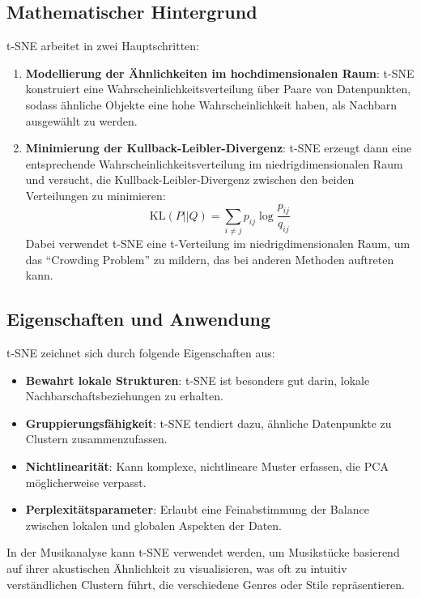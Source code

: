 \subsection{Mathematischer Hintergrund}

t-SNE arbeitet in zwei Hauptschritten:

\begin{enumerate}
    \item \textbf{Modellierung der Ähnlichkeiten im hochdimensionalen Raum}: t-SNE konstruiert eine Wahrscheinlichkeitsverteilung über Paare von Datenpunkten, sodass ähnliche Objekte eine hohe Wahrscheinlichkeit haben, als Nachbarn ausgewählt zu werden.
    \item \textbf{Minimierung der Kullback-Leibler-Divergenz}: t-SNE erzeugt dann eine entsprechende Wahrscheinlichkeitsverteilung im niedrigdimensionalen Raum und versucht, die Kullback-Leibler-Divergenz zwischen den beiden Verteilungen zu minimieren:
    \[
    \text{KL}(P || Q) = \sum_{i \neq j} p_{ij} \log \frac{p_{ij}}{q_{ij}}
    \]
    Dabei verwendet t-SNE eine t-Verteilung im niedrigdimensionalen Raum, um das ``Crowding Problem'' zu mildern, das bei anderen Methoden auftreten kann.
\end{enumerate}

\subsection{Eigenschaften und Anwendung}

t-SNE zeichnet sich durch folgende Eigenschaften aus:

\begin{itemize}
    \item \textbf{Bewahrt lokale Strukturen}: t-SNE ist besonders gut darin, lokale Nachbarschaftsbeziehungen zu erhalten.
    \item \textbf{Gruppierungsfähigkeit}: t-SNE tendiert dazu, ähnliche Datenpunkte zu Clustern zusammenzufassen.
    \item \textbf{Nichtlinearität}: Kann komplexe, nichtlineare Muster erfassen, die PCA möglicherweise verpasst.
    \item \textbf{Perplexitätsparameter}: Erlaubt eine Feinabstimmung der Balance zwischen lokalen und globalen Aspekten der Daten.
\end{itemize}

In der Musikanalyse kann t-SNE verwendet werden, um Musikstücke basierend auf ihrer akustischen Ähnlichkeit zu visualisieren, was oft zu intuitiv verständlichen Clustern führt, die verschiedene Genres oder Stile repräsentieren.

